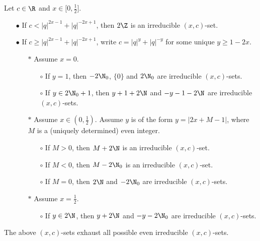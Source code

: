 \begin{Prop}\label{PropClass1D} Let $c\in \R$ and $x\in \lbrack 0,\frac{1}{2}\rbrack$.  
\begin{itemize}
\item[$\bullet$] If $c< |q|^{2x-1}+|q|^{-2x+1}$, then $2\Z$ is an irreducible $(x,c)$-set.
\item[$\bullet$] If $c\geq |q|^{2x-1}+|q|^{-2x+1}$, write $c=|q|^y+|q|^{-y}$ for some unique $y\geq 1-2x$. 
\begin{itemize}\item[$*$] Assume $x=0$.
\begin{itemize}\item[$\circ$] If $y=1$, then $-2\N_0$, $\{0\}$ and $2\N_0$ are irreducible $(x,c)$-sets.
\item[$\circ$] If $y\in 2\N_0+1$, then $y+1+2\N$ and $-y-1-2\N$ are irreducible $(x,c)$-sets.
\end{itemize}
\item[$*$] Assume $x\in (0,\frac{1}{2})$. Assume $y$ is of the form $y=|2x+M-1|$, where $M$ is a (uniquely determined) even integer. 
\begin{itemize}\item[$\circ$] If $M>0$, then $M+2\N$ is an irreducible $(x,c)$-set. 
\item[$\circ$] If $M<0$, then $M-2\N_0$ is an irreducible $(x,c)$-set. 
\item[$\circ$] If $M=0$, then $2\N$ and $-2\N_0$ are irreducible $(x,c)$-sets.
\end{itemize}
\item[$*$] Assume $x=\frac{1}{2}$.
\begin{itemize}\item[$\circ$] If $y\in 2\N$, then $y+2\N$ and $-y-2\N_0$ are irreducible $(x,c)$-sets.
\end{itemize}
\end{itemize}
\end{itemize}
The above $(x,c)$-sets exhaust all possible even irreducible $(x,c)$-sets.
\end{Prop} 
